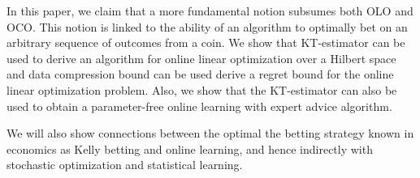 In this paper, we claim that a more fundamental notion subsumes both \ac{OLO} and \ac{OCO}. This notion is linked to the ability of an algorithm to optimally bet on an arbitrary sequence of outcomes from a coin.
We show that \ac{KT}-estimator can be used to derive an algorithm for online linear
optimization over a Hilbert space and data compression bound can be used derive
a regret bound for the online linear optimization problem. Also, we show that the \ac{KT}-estimator can also be used to obtain a parameter-free online learning with expert advice algorithm.


We will also show connections between the optimal the betting strategy known in economics as Kelly betting \citep{Kelly56} and online learning, and hence indirectly with stochastic optimization and statistical learning.